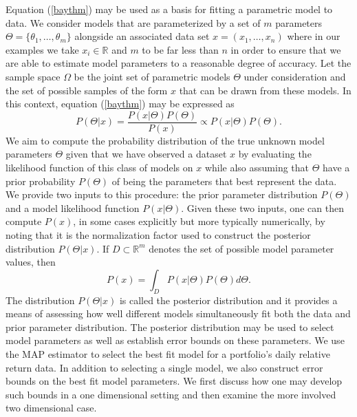\documentclass{amsart}
\begin{document}
Equation (\ref{baythm}) may be used as a basis for fitting  a parametric model to data.  
We consider models that are parameterized by a set of $m$ parameters 
$\Theta = \{\theta_1,\ldots,\theta_m\}$
alongside an associated data set $x = (x_1,\dots, x_n)$ where in our examples we 
take $x_i\in\mathbb{R}$ and 
$m$ to be far less than $n$ in order to ensure that we are able to estimate model parameters 
to a reasonable degree of accuracy. Let the sample space $\Omega$ be the joint set 
of parametric models $\Theta$ 
under consideration and the  set of possible samples of the form $x$ that can be drawn from these models.  
In this context, equation (\ref{baythm}) may be expressed as 
%
\begin{equation}
    P(\Theta|x) = \frac{P(x|\Theta)P(\Theta)}{P(x)}\propto P(x|\Theta) P(\Theta).
    \label{mbt}
\end{equation}
%
We aim to compute the probability distribution of the true unknown model 
parameters $\Theta$ given that we have observed a dataset $x$
by evaluating the likelihood function of this class of models on $x$ while also
assuming that $\Theta$ have a prior probability 
$P(\Theta)$ of being the parameters that best represent the data.
We provide two inputs to this procedure: the prior parameter distribution $P(\Theta)$ and 
a model likelihood function $P(x|\Theta)$.  
Given these two inputs, one can then compute $P(x)$, in some cases explicitly but more typically 
numerically, by noting that it is the normalization factor 
used to construct the posterior distribution $P(\Theta|x)$. If $D\subset\mathbb{R}^m$ denotes 
the set of possible model parameter values, then
%
\begin{equation}
    P(x) = \int_D P(x|\Theta) P(\Theta) d\Theta. \label{normfact}
\end{equation}
%
The distribution $P(\Theta|x)$ is called the posterior distribution and it 
provides a means of assessing how well different models simultaneously fit both the 
data and prior parameter distribution.  The posterior distribution may be used to 
select model parameters as well as establish error bounds on these parameters.
We use the MAP estimator to select the best fit model for a portfolio's daily relative return data. 
In addition to selecting a single model, we also construct error  
 bounds on the best fit model parameters. We first discuss how one may 
develop such bounds in a one dimensional setting 
and then examine the more involved two dimensional case.
\end{document}
